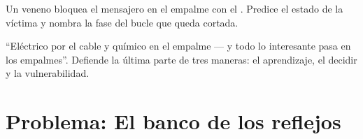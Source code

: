 \begin{exercise}[$\star\star$]\label{exo:g8:nervous-communication:11}
Un veneno bloquea el mensajero en el empalme con el . Predice el
estado de la víctima y nombra la fase del bucle que queda cortada.
\end{exercise}

\begin{exercise}[$\star\star\star$]\label{exo:g8:nervous-communication:12}
``Eléctrico por el cable y químico en el empalme --- y todo lo
interesante pasa en los empalmes''. Defiende la última parte de tres
maneras: el aprendizaje, el decidir y la vulnerabilidad.
\end{exercise}

\section{Problema: El banco de los reflejos}

